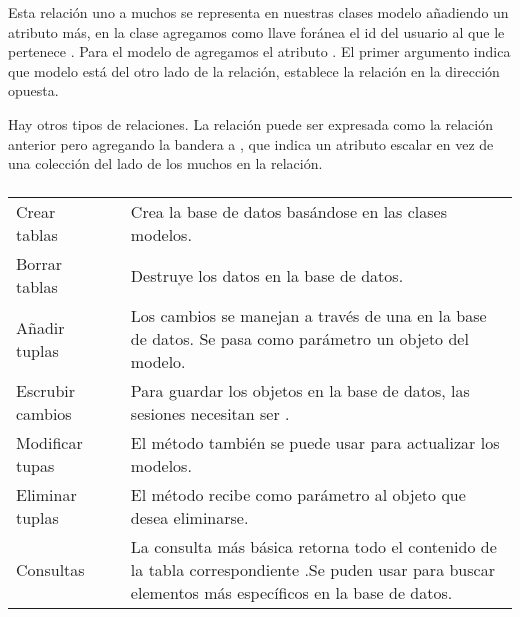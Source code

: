 Esta relación uno a muchos se representa en nuestras clases modelo añadiendo
un atributo más, en la clase  agregamos como
llave foránea el id del usuario al que le
pertenece .
Para el modelo de  agregamos el atributo
. El primer argumento
indica que modelo está del otro lado de la relación,  establece la
relación en la dirección opuesta.

Hay otros tipos de relaciones. La relación   puede ser expresada
como la relación anterior pero agregando la bandera  a
, que indica  un atributo escalar en vez de una colección
del lado de los muchos en la relación.


\subparagraph{}
\label{\detokenize{chapter_two/desc_cloudnao:operaciones-sobre-la-base-de-datos}}

\begin{savenotes}\sphinxattablestart
\centering
\begin{tabulary}{\linewidth}[t]{|T|T|T|}
\hline
{}\relax &\relax &\relax \\
\hline
Crear tablas
&
&
Crea la base de datos basándose en las clases modelos.
\\
\hline
Borrar tablas
&
&
Destruye los datos en la base de datos.
\\
\hline
Añadir tuplas
&
&
Los cambios  se manejan a través de una  en la base de datos. Se pasa como parámetro un objeto del modelo.
\\
\hline
Escrubir cambios
&
&
Para guardar los objetos en la base de datos, las sesiones necesitan ser .
\\
\hline
Modificar tupas
&
 
&
El método  también se puede usar para actualizar los modelos.
\\
\hline
Eliminar tuplas
&
&
El método  recibe como parámetro al objeto que desea eliminarse.
\\
\hline
Consultas
&
 
&
La consulta más básica retorna todo el contenido de la tabla correspondiente .Se puden usar  para buscar elementos más específicos en la base de datos.
\\
\hline
\end{tabulary}
\par
\sphinxattableend\end{savenotes}


